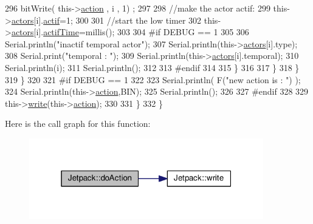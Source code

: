 \begin{DoxyCode}
296                         bitWrite( this->\hyperlink{classJetpack_aca3142925a7b0834b34ae91d26af7765}{action} , i , 1) ;
297 
298                         \textcolor{comment}{//make the actor actif:}
299                         this->\hyperlink{classJetpack_a7e16d2f97837f9712a2e6de1c50d99db}{actors}[i].\hyperlink{structJetpack_1_1state_aa177541689bbaea21a4650a083b0df77}{actif}=1;
300 
301                         \textcolor{comment}{//start the low timer}
302                         this->\hyperlink{classJetpack_a7e16d2f97837f9712a2e6de1c50d99db}{actors}[i].\hyperlink{structJetpack_1_1state_af2e1cc323ef9ffcc3cf4d203f85d726b}{actifTime}=millis();
303 
304 \textcolor{preprocessor}{                    #if DEBUG == 1 }
305                         
306                         Serial.println(\textcolor{stringliteral}{"inactif temporal actor"});
307                         Serial.println(this->\hyperlink{classJetpack_a7e16d2f97837f9712a2e6de1c50d99db}{actors}[i].type);
308                         Serial.print(\textcolor{stringliteral}{"temporal : "});
309                         Serial.println(this->\hyperlink{classJetpack_a7e16d2f97837f9712a2e6de1c50d99db}{actors}[i].temporal);
310                         Serial.println(i);
311                         Serial.println();
312                     
313 \textcolor{preprocessor}{                    #endif}
314                 
315                     \}           
316             
317                 \}
318             \}
319         \}
320     
321 \textcolor{preprocessor}{    #if DEBUG == 1 }
322 
323         Serial.println( F(\textcolor{stringliteral}{"new action is : "}) );
324         Serial.println(this->\hyperlink{classJetpack_aca3142925a7b0834b34ae91d26af7765}{action},BIN);
325         Serial.println();
326     
327 \textcolor{preprocessor}{    #endif }
328 
329         this->\hyperlink{classJetpack_a338f1af8cbc6504ac69b47c7328569b5}{write}(this->\hyperlink{classJetpack_aca3142925a7b0834b34ae91d26af7765}{action});
330 
331     \} 
332 \}
\end{DoxyCode}
Here is the call graph for this function\+:\nopagebreak
\begin{figure}[H]
\begin{center}
\leavevmode
\includegraphics[width=289pt]{classJetpack_a86d2e83436ef4b85f4c3a6e85ac785b0_cgraph}
\end{center}
\end{figure}
